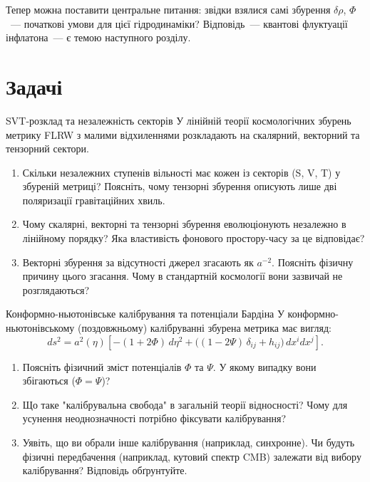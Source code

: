 
Тепер можна поставити центральне питання: звідки взялися
самі збурення $\delta\rho$, $\Phi$~--- початкові умови
для цієї гідродинаміки? Відповідь~--- квантові флуктуації
інфлатона~--- є темою наступного розділу.



\section*{Задачі}

\begin{problem}{SVT-розклад та незалежність секторів}
У лінійній теорії космологічних збурень метрику FLRW з малими відхиленнями
розкладають на скалярний, векторний та тензорний сектори.

\begin{enumerate}
    \item Скільки незалежних ступенів вільності має кожен із секторів
          (S, V, T) у збуреній метриці? Поясніть, чому тензорні збурення
          описують лише дві поляризації гравітаційних хвиль.
    \item Чому скалярні, векторні та тензорні збурення еволюціонують
          незалежно в лінійному порядку? Яка властивість фонового
          простору-часу за це відповідає?
    \item Векторні збурення за відсутності джерел згасають як $a^{-2}$.
          Поясніть фізичну причину цього згасання. Чому в стандартній
          космології вони зазвичай не розглядаються?
\end{enumerate}
\end{problem}


\begin{problem}{Конформно-ньютонівське калібрування та потенціали Бардіна}
У конформно-ньютонівському (поздовжньому) калібруванні збурена метрика має вигляд:
\[
ds^2 = a^2(\eta)\left[-(1 + 2\Phi)\,d\eta^2 + \bigl((1 - 2\Psi)\,\delta_{ij} + h_{ij}\bigr)\,dx^i dx^j\right].
\]

\begin{enumerate}
    \item Поясніть фізичний зміст потенціалів $\Phi$ та $\Psi$.
          У якому випадку вони збігаються ($\Phi = \Psi$)?
    \item Що таке "калібрувальна свобода" в загальній теорії відносності?
          Чому для усунення неоднозначності потрібно фіксувати калібрування?
    \item Уявіть, що ви обрали інше калібрування (наприклад, синхронне).
          Чи будуть фізичні передбачення (наприклад, кутовий спектр CMB)
          залежати від вибору калібрування? Відповідь обґрунтуйте.
\end{enumerate}
\end{problem}

